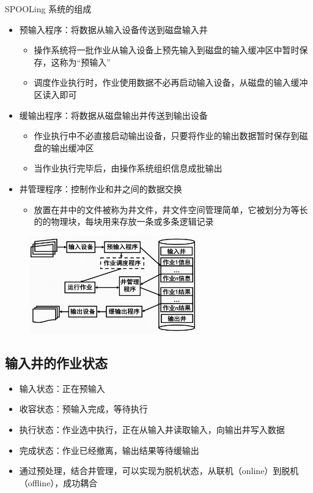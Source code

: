\documentclass[cs4size,a4paper,10pt]{ctexart}
\begin{document}
		SPOOLing 系统的组成
		\begin{itemize}
			\item 预输入程序：将数据从输入设备传送到磁盘输入井
			\begin{itemize}
				\item 操作系统将一批作业从输入设备上预先输入到磁盘的输入缓冲区中暂时保存，这称为“预输入”
				\item 调度作业执行时，作业使用数据不必再启动输入设备，从磁盘的输入缓冲区读入即可
			\end{itemize}
			\item 缓输出程序：将数据从磁盘输出井传送到输出设备
			\begin{itemize}
				\item 作业执行中不必直接启动输出设备，只要将作业的输出数据暂时保存到磁盘的输出缓冲区
				\item 当作业执行完毕后，由操作系统组织信息成批输出
			\end{itemize}
			\item 井管理程序：控制作业和井之间的数据交换
			\begin{itemize}
				\item 放置在井中的文件被称为井文件，井文件空间管理简单，它被划分为等长的的物理块，每块用来存放一条或多条逻辑记录
			\end{itemize}
		\end{itemize}
		\begin{figure}[H]
			\centering
			\includegraphics[width=0.65\textwidth]{img/4.5.1}
		\end{figure}

		\subsection{输入井的作业状态}
		\begin{itemize}
			\item 输入状态：正在预输入
			\item 收容状态：预输入完成，等待执行
			\item 执行状态：作业选中执行，正在从输入井读取输入，向输出井写入数据
			\item 完成状态：作业已经撤离，输出结果等待缓输出
			\item 通过预处理，结合井管理，可以实现为脱机状态，从联机（online）到脱机（offline），成功耦合
		\end{itemize}
		
\end{document}
